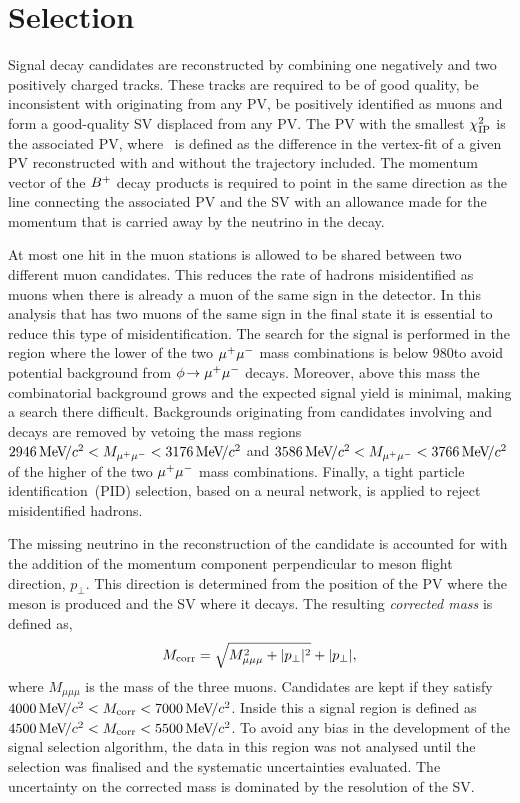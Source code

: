 \section{Selection}
\label{sec:Selection}
Signal \Bp decay candidates are reconstructed by combining one negatively and 
two positively charged tracks. These tracks are required to be of good quality, be inconsistent with originating from any PV, be positively identified as muons and form a good-quality SV 
displaced from any PV. The PV with the smallest $\chi^2_{\text{IP}}$ is the associated PV, where \chisqip\ is defined as 
the difference in the vertex-fit \chisq of a given PV reconstructed with and
without the \Bp trajectory included.
The momentum vector of the ${{{B}^+}}$ decay products is 
required to point in the same direction as the line connecting the 
associated PV and the SV with an allowance made for the momentum that 
is carried away by the neutrino in the decay. 

At most one hit in the muon 
stations is allowed to be shared between two different muon candidates. This reduces the rate of hadrons misidentified as muons when there is already a muon of the same sign in the detector. In this analysis that has two muons of the same sign in
the final state it is essential to reduce this type of misidentification. The search for the signal is performed in the region where the lower of
the two ${\mu^+\mu^-}$ mass combinations is below $980$\mevcc to avoid potential 
background from 
$\phi\!\rightarrow {\ensuremath{\mu^+}}{\ensuremath{\mu^-}}$ decays. Moreover, above this mass the 
combinatorial background grows and the expected signal yield is minimal, 
making a search there difficult. Backgrounds originating from candidates 
involving \jpsi and \psitwos decays are removed by vetoing the mass 
regions $2946{\mathrm{\,Me\kern -0.1em V\!/}c^2} < M_{{\mu^+}{\mu^-}} < 3176{\mathrm{\,Me\kern -0.1em V\!/}c^2}$ and $3586{\mathrm{\,Me\kern -0.1em V\!/}c^2} < 
M_{{\mu^+}{\mu^-}} < 3766{\mathrm{\,Me\kern -0.1em V\!/}c^2}$ of the higher of the two ${\mu^+\mu^-}$ mass 
combinations. Finally, a tight particle identification~(PID) selection, 
based on a neural network, is applied to reject misidentified hadrons.

The missing neutrino in the reconstruction of the \Bp candidate is accounted for with the addition of the momentum component perpendicular to \B meson flight direction, $p_\perp$. This direction is determined from the position of the PV where the \Bp meson is produced and the SV where it decays. The resulting \textit{corrected mass} is defined as,
\begin{equation}
	M_{\rm{corr}} = \sqrt{M_{\mu\mu\mu}^{2} + |p_{\perp}|^2} + |p_{\perp}|,
\end{equation}
where $M_{\mu\mu\mu}$ is the mass of the three muons. Candidates are kept if they satisfy $4000{\mathrm{\,Me\kern -0.1em V\!/}c^2} < M_{\rm{corr}} < 7000{\mathrm{\,Me\kern -0.1em V\!/}c^2}$. Inside this a signal region is defined as  $4500{\mathrm{\,Me\kern -0.1em V\!/}c^2} < M_{\rm{corr}} < 5500{\mathrm{\,Me\kern -0.1em V\!/}c^2}$. To avoid any bias in the development of the signal selection algorithm, the data in this region was not analysed until the selection was finalised and the systematic uncertainties evaluated. The uncertainty on the corrected mass is dominated by the resolution of the SV.

